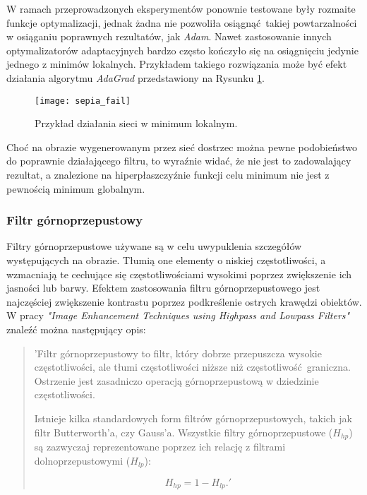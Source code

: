     W ramach przeprowadzonych eksperymentów ponownie testowane były rozmaite funkcje
    optymalizacji, jednak żadna nie pozwoliła osiągnąć takiej powtarzalności w osiąganiu
    poprawnych rezultatów, jak \textit{Adam}. Nawet zastosowanie innych optymalizatorów
    adaptacyjnych bardzo często kończyło się na osiągnięciu jedynie jednego z minimów
    lokalnych. Przykładem takiego rozwiązania może być efekt działania algorytmu
    \textit{AdaGrad} przedstawiony na Rysunku \ref{fig:sepia_fail}.

    \begin{figure}[h!]
      \centering
      \texttt{[image: sepia\_fail]}
      \caption[Przykład działania sieci w minimum lokalnym - źródło: Rysunek własny]{Przykład działania sieci w minimum lokalnym.}
      \label{fig:sepia_fail}
    \end{figure}

    Choć na obrazie wygenerowanym przez sieć dostrzec można pewne podobieństwo do
    poprawnie działającego filtru, to wyraźnie widać, że nie jest to zadowalający
    rezultat, a znalezione na hiperpłaszczyźnie funkcji celu minimum nie jest z pewnością
    minimum globalnym.

  \subsubsection{Filtr górnoprzepustowy}

    Filtry górnoprzepustowe używane są w celu uwypuklenia szczegółów występujących na
    obrazie. Tłumią one elementy o niskiej częstotliwości, a wzmacniają te cechujące
    się częstotliwościami wysokimi poprzez zwiększenie ich jasności lub barwy.
    Efektem zastosowania filtru górnoprzepustowego jest najczęściej zwiększenie
    kontrastu poprzez podkreślenie ostrych krawędzi obiektów. W pracy
    \textit{"Image Enhancement Techniques using Highpass and
    Lowpass Filters"} \cite{highpass_filter} znaleźć można następujący opis:

    \begin{quote}
      'Filtr górnoprzepustowy to filtr, który dobrze przepuszcza wysokie częstotliwości,
      ale tłumi częstotliwości niższe niż częstotliwość graniczna. Ostrzenie jest
      zasadniczo operacją górnoprzepustową w dziedzinie częstotliwości.

      Istnieje kilka standardowych form filtrów górnoprzepustowych, takich jak
      filtr Butterworth'a, czy Gauss'a. Wszystkie filtry górnoprzepustowe ($H_{hp}$) są
      zazwyczaj reprezentowane poprzez ich relację z filtrami dolnoprzepustowymi ($H_{lp}$):

      \[H_{hp} = 1 - H_{lp}.   '\]
    \end{quote}

